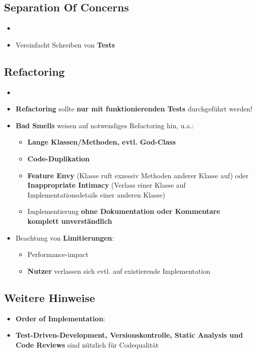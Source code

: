 \subsection{Separation Of Concerns}
\label{cc:sub:separation_of_concerns}

\begin{itemize}
	\item {}
	\item Vereinfacht Schreiben von \textbf{Tests}
\end{itemize}

\subsection{Refactoring}
\label{cc:sub:refactoring}

\begin{itemize}
	\item {}
	\item \textbf{Refactoring} sollte \textbf{nur mit funktionierenden Tests} durchgeführt werden!
	\item \textbf{Bad Smells} weisen auf notwendiges Refactoring hin, u.a.:
	\begin{itemize}
		\item \textbf{Lange Klassen/Methoden, evtl. God-Class}
		\item \textbf{Code-Duplikation}
		\item \textbf{Feature Envy} (Klasse ruft exzessiv Methoden anderer Klasse auf) oder \textbf{Inappropriate Intimacy} (Verlass einer Klasse auf Implementationsdetails einer anderen Klasse)
		\item Implementierung \textbf{ohne Dokumentation oder Kommentare komplett unverständlich}
	\end{itemize}
	\item Beachtung von \textbf{Limitierungen}:
	\begin{itemize}
		\item Performance-impact
		\item \textbf{Nutzer} verlassen sich evtl. auf existierende Implementation
	\end{itemize}
\end{itemize}

\subsection{Weitere Hinweise}
\label{cc:sub:weitere_hinweise}

\begin{itemize}
	\item \textbf{Order of Implementation}: 
	\item \textbf{Test-Driven-Development, Versionskontrolle, Static Analysis und Code Reviews} sind nützlich für Codequalität
\end{itemize}